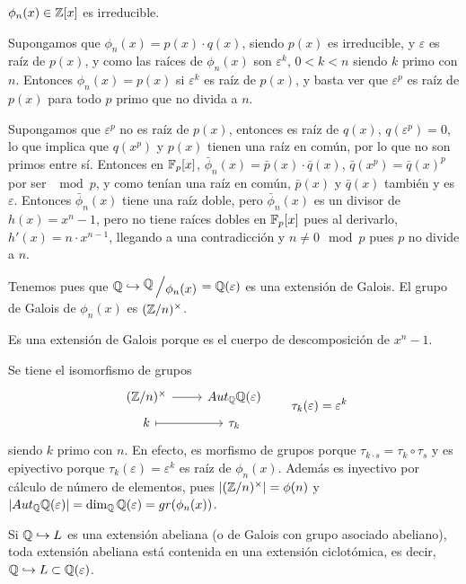 \begin{teo}
    $\phi_n(x) \in \mathbb{Z}[x]$ es irreducible.
\end{teo}
\begin{dem}
    Supongamos que $\phi_n(x) = p(x)\cdot q(x)$, siendo $p(x)$ es irreducible, y $\varepsilon$ es ra\'iz de $p(x)$, y como las ra\'ices de $\phi_n(x)$ son $\varepsilon^k$, $0<k<n$ siendo $k$ primo con $n$. Entonces $\phi_n(x) = p(x)$ si $\varepsilon^k$ es ra\'iz de $p(x)$, y basta ver que $\varepsilon^p$ es ra\'iz de $p(x)$ para todo $p$ primo que no divida a $n$. 

    Supongamos que $\varepsilon^p$ no es ra\'iz de $p(x)$, entonces es ra\'iz de $q(x)$, $q(\varepsilon^p)=0$, lo que implica que $q(x^p)$ y $p(x)$ tienen una ra\'iz en com\'
    un, por lo que no son primos entre s\'i. Entonces en $\mathbb{F}_p[x]$, $\bar \phi_n(x) = \bar p(x)\cdot \bar q(x)$, $\bar q(x^p) = \bar q(x)^p$ por ser $\mod p$, y como ten\'ian una ra\'iz en com\'un, $\bar p(x)$ y $\bar q(x)$ tambi\'en y es $\varepsilon$. Entonces $\bar \phi_n(x)$ tiene una ra\'iz doble, pero $\bar \phi_n(x)$ es un divisor de $h(x)=x^{n}-1$, pero no tiene ra\'ices dobles en $\mathbb{F}_p[x]$ pues al derivarlo, $h'(x)=n \cdot x^{n-1}$, llegando a una contradicci\'on y $n \neq 0\mod p$ pues $p$ no divide a $n$. 
\end{dem}
\begin{prop} Tenemos pues que $\bb Q \hookrightarrow \modulo{\bb Q}{\phi_n(x)} = \bb Q(\varepsilon)$ es una extensi\'on de Galois. El grupo de Galois de $\phi_n(x)$ es $(\mathbb{Z}/n)^{\times}$.
\end{prop}
\begin{dem}
    Es una extensi\'on de Galois porque es el cuerpo de descomposici\'on de $x^n-1$. 

    Se tiene el isomorfismo de grupos
    $$\bt (\bb Z/n)^{\times} \rar & Aut_{\bb Q}\bb Q(\varepsilon) \\[-5mm] k \rarmaps & \tau_k \et\qquad \tau_k(\varepsilon) = \varepsilon^k$$
    siendo $k$ primo con $n$. En efecto, es morfismo de grupos porque $\tau_{k \cdot s} = \tau_ k \circ \tau_s$ y es epiyectivo porque $\tau_k(\varepsilon) = \varepsilon^k$ es ra\'iz de $\phi_n(x)$. Adem\'as es inyectivo por c\'alculo de n\'umero de elementos, pues $|(\mathbb{Z}/n)^{\times}| = \phi(n)$ y $| Aut_{\mathbb{Q}}\mathbb{Q}(\varepsilon)| = \dim_{\mathbb{Q}}\mathbb{Q}(\varepsilon) = gr(\phi_n(x))$. 
\end{dem}
\begin{teo}
    Si $\mathbb{Q} \hookrightarrow L$ es una extensi\'on abeliana (o de Galois con grupo asociado abeliano), toda extensi\'on abeliana est\'a contenida en una extensi\'on ciclot\'omica, es decir, $\mathbb{Q} \hookrightarrow L \subset \mathbb{Q}(\varepsilon)$. 
\end{teo}
